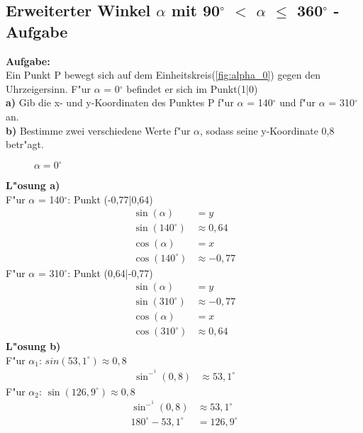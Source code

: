 \documentclass{standalone}
\begin{document}
\subsection{Erweiterter Winkel $\alpha$ mit 90$^\circ$  $<$ $\alpha$ $\leq$ 360$^\circ$  - Aufgabe}

\noindent\textbf{Aufgabe:}\\
Ein Punkt P bewegt sich auf dem Einheitskreis(\autoref{fig:alpha_0}) gegen den Uhrzeigersinn. F{"u}r $\alpha$ = 0$^\circ$  befindet er sich im Punkt(1|0)\\
\textbf{a)} Gib die x- und y-Koordinaten des Punktes P f{"u}r $\alpha$ = 140$^\circ$  und f{"u}r $\alpha$ = 310$^\circ$  an.\\
\textbf{b)} Bestimme zwei verschiedene Werte f{"u}r $\alpha$, sodass seine y-Koordinate 0,8 betr{"a}gt.\\

\begin{figure}[hb!]
  \centering
  \def\svgwidth{200px}
  
  \caption{$\alpha = 0^\circ $}
  \label{fig:alpha_0}
\end{figure}

\newpage

\noindent\textbf{L{"o}sung a)}\\
\noindent F{"u}r $\alpha$ = 140$^\circ$: Punkt (-0,77|0,64)
\begin{align}
  \sin(\alpha)     & = y \tag{1}           \\
  \sin(140^\circ ) & \approx 0,64 \tag{2}  \\
  \cos(\alpha)     & = x \tag{3}           \\
  \cos(140^\circ ) & \approx -0,77 \tag{4}
\end{align}
\noindent F{"u}r $\alpha$ = 310$^\circ$: Punkt (0,64|-0,77)
\begin{align}
  \sin(\alpha)     & = y \tag{1}           \\
  \sin(310^\circ ) & \approx -0,77 \tag{2} \\
  \cos(\alpha)     & = x \tag{3}           \\
  \cos(310^\circ ) & \approx 0,64 \tag{4}
\end{align}
\noindent\textbf{L{"o}sung b)}\\
\noindent F{"u}r $\alpha_1$: $sin(53,1^\circ) \approx 0,8$
\begin{align}
  \sin^-^1(0,8) & \approx 53,1^\circ \tag{1}
\end{align}
\noindent F{"u}r $\alpha_2$: $\sin(126,9^\circ) \approx 0,8$
\begin{align}
  \sin^-^1(0,8)          & \approx 53,1^\circ \tag{1} \\
  180^\circ - 53,1^\circ & = 126,9^\circ \tag{2}
\end{align}
\end{document}
